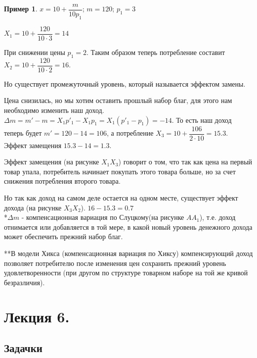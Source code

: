 \documentclass[reqno]{article}
\theoremstyle{definition}
\theoremstyle{definition}
\theoremstyle{definition}
\newtheorem*{exmp}{Пример}
\theoremstyle{definition}
\theoremstyle{definition}
\theoremstyle{definition}
\theoremstyle{definition}
\theoremstyle{definition}
\theoremstyle{definition}
\begin{document}
	\begin{exmp}
		
		$x=10+\dfrac{m}{10 p_1}$; $m=120$; $p_1 =3$
		
		$X_1 = 10 + \dfrac{120}{10 \cdot 3} = 14$
		
		При снижении цены $p_1 = 2$. Таким образом теперь потребление составит $X_2 =10+\dfrac{120}{10 \cdot 2} = 16$.
		
		Но существует промежуточный уровень, который называется эффектом замены.
		
		Цена снизилась, но мы хотим оставить прошлый набор благ, для этого нам необходимо изменить наш доход. $\Delta m = m' - m = X_1 p'_1 - X_1 p_1 = X_1 (p'_1 - p_1) = -14$. То есть наш доход теперь будет $m' = 120 - 14 = 106$, а потребление $X_3 = 10 + \dfrac{106}{2 \cdot 10} = 15.3$. Эффект замещения $15.3-14=1.3$. 
		
		Эффект замещения (на рисунке $X_1 X_3$) говорит о том, что так как цена на первый товар упала, потребитель начинает покупать этого товара больше, но за счет снижения потребления второго товара. 
		
		Но так как доход на самом деле остается на одном месте, существует эффект дохода (на рисунке $X_3 X_2$). $16-15.3=0.7$ \\ 
		
		*$\Delta m$ - компенсационная вариация по Слуцкому(на рисунке $A A_1$), т.е. доход отнимается или добавляется в той мере, в какой новый уровень денежного дохода может обеспечить прежний набор благ. 
		
		**В модели Хикса (компенсационная вариация по Хиксу) компенсирующий доход позволяет потребителю после изменения цен сохранить прежний уровень удовлетворенности (при другом по структуре товарном наборе на той же кривой безразличия).
		
	\end{exmp}
	\newpage
	
	\section{Лекция 6.}
	
	\subsection{Задачки}
	
\end{document}
